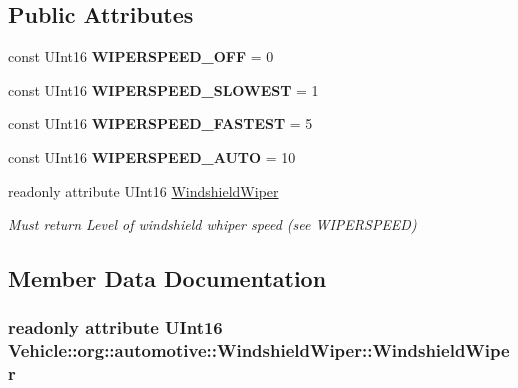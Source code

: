 \subsection*{Public Attributes}
\begin{DoxyCompactItemize}
\item 
\hypertarget{interfaceVehicle_1_1org_1_1automotive_1_1WindshieldWiper_a669630d2cf44b206709f4962ca1918da}{const U\-Int16 {\bfseries W\-I\-P\-E\-R\-S\-P\-E\-E\-D\-\_\-\-O\-F\-F} = 0}\label{interfaceVehicle_1_1org_1_1automotive_1_1WindshieldWiper_a669630d2cf44b206709f4962ca1918da}

\item 
\hypertarget{interfaceVehicle_1_1org_1_1automotive_1_1WindshieldWiper_aa79c61fe3f197a5edded0559dd9c177d}{const U\-Int16 {\bfseries W\-I\-P\-E\-R\-S\-P\-E\-E\-D\-\_\-\-S\-L\-O\-W\-E\-S\-T} = 1}\label{interfaceVehicle_1_1org_1_1automotive_1_1WindshieldWiper_aa79c61fe3f197a5edded0559dd9c177d}

\item 
\hypertarget{interfaceVehicle_1_1org_1_1automotive_1_1WindshieldWiper_a1dbbf8533e63a33ddbe5f183fae1f325}{const U\-Int16 {\bfseries W\-I\-P\-E\-R\-S\-P\-E\-E\-D\-\_\-\-F\-A\-S\-T\-E\-S\-T} = 5}\label{interfaceVehicle_1_1org_1_1automotive_1_1WindshieldWiper_a1dbbf8533e63a33ddbe5f183fae1f325}

\item 
\hypertarget{interfaceVehicle_1_1org_1_1automotive_1_1WindshieldWiper_ab8a3e61c92feea7f7b14c042a58972a3}{const U\-Int16 {\bfseries W\-I\-P\-E\-R\-S\-P\-E\-E\-D\-\_\-\-A\-U\-T\-O} = 10}\label{interfaceVehicle_1_1org_1_1automotive_1_1WindshieldWiper_ab8a3e61c92feea7f7b14c042a58972a3}

\item 
readonly attribute U\-Int16 \hyperlink{interfaceVehicle_1_1org_1_1automotive_1_1WindshieldWiper_adc76578bdf9fac0cf7c629581adbe709}{Windshield\-Wiper}
\begin{DoxyCompactList}\small\item\em Must return Level of windshield whiper speed (see W\-I\-P\-E\-R\-S\-P\-E\-E\-D) \end{DoxyCompactList}\end{DoxyCompactItemize}


\subsection{Member Data Documentation}
\hypertarget{interfaceVehicle_1_1org_1_1automotive_1_1WindshieldWiper_adc76578bdf9fac0cf7c629581adbe709}{
\subsubsection[{Windshield\-Wiper}]{\setlength{\rightskip}{0pt plus 5cm}readonly attribute U\-Int16 Vehicle\-::org\-::automotive\-::\-Windshield\-Wiper\-::\-Windshield\-Wiper}}\label{interfaceVehicle_1_1org_1_1automotive_1_1WindshieldWiper_adc76578bdf9fac0cf7c629581adbe709}


